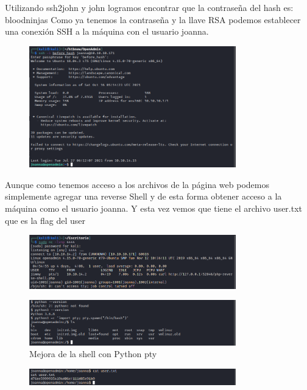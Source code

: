\documentclass{article}
\begin{document}
Utilizando ssh2john y john logramos encontrar que la contraseña del hash es: bloodninjas
Como ya tenemos la contraseña y la llave RSA podemos establecer una conexión SSH a la máquina con el usuario joanna.
\begin{figure}[H]
	\center
	\includegraphics[width=0.8\textwidth]{images/openadmin/16-sshjoanna.png}
	\caption{}
\end{figure}

Aunque como tenemos acceso a los archivos de la página web podemos simplemente agregar una reverse Shell y de esta forma obtener acceso a la máquina como el usuario joanna. Y esta vez vemos que tiene el archivo user.txt que es la flag del user
\begin{figure}[H]
	\center
	\includegraphics[width=0.8\textwidth]{images/openadmin/17-alternativa.png}
	\caption{}
\end{figure}

\begin{figure}[H]
	\center
	\includegraphics[width=0.8\textwidth]{images/openadmin/17-alternativa2.png}
	\caption{Mejora de la shell con Python pty}
\end{figure}

\begin{figure}[H]
	\center
	\includegraphics[width=0.8\textwidth]{images/openadmin/17-alternativa3.png}
	\caption{}
\end{figure}
\end{document}
